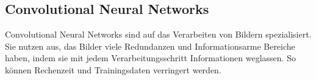 \documentclass[german,a4paper, 12pt]{llncs}
\begin{document}

\subsection*{Convolutional Neural Networks}
Convolutional Neural Networks sind auf das Verarbeiten von Bildern spezialisiert. Sie nutzen aus, das Bilder viele Redundanzen und Informationsarme Bereiche haben, indem sie mit jedem Verarbeitungsschritt Informationen weglassen. So können Rechenzeit und Trainingsdaten verringert werden.\cite{introToCNN,surveyOfDeepLearing,cNNforClass}



\end{document}
